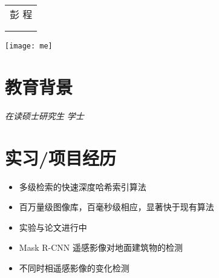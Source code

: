 \documentclass{resume}
\begin{document}

\medskip\noindent
\begin{minipage}{0.7\textwidth}
  \Large{
    \begin{tabu}  { l }
      \scshape{彭 \quad  程} \\
       \\
       \\
    \end{tabu}
  }
\end{minipage}
\begin{minipage}{0.3\textwidth}
  \raggedleft
  \texttt{[image: me]}
\end{minipage}

\section{  教育背景}
\textit{在读硕士研究生} 
\textit{学士}

\section{ 实习/项目经历}

\begin{itemize}[topsep = 0 pt, partopsep = 0pt]
  \item 多级检索的快速深度哈希索引算法
  \item 百万量级图像库，百毫秒级相应，显著快于现有算法
  \item 实验与论文进行中
\end{itemize}


\begin{itemize}[topsep = 0 pt, partopsep = 0pt]
  \item Mask R-CNN 遥感影像对地面建筑物的检测
  \item 不同时相遥感影像的变化检测
\end{itemize}
\end{document}
